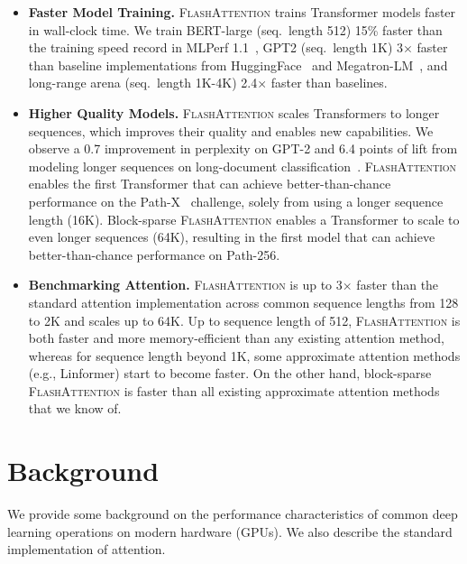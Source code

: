 \begin{itemize}[itemsep=0.1pt,topsep=0pt,leftmargin=*]
  \item \textbf{Faster Model Training.} \textsc{FlashAttention} trains Transformer models faster in wall-clock time. We train BERT-large (seq.\ length 512) 15\% faster than the training speed record in MLPerf 1.1~\citep{mattson2020mlperf}, GPT2 (seq.\ length 1K) 3$\times$ faster than baseline implementations from HuggingFace~\citep{wolf-etal-2020-transformers} and Megatron-LM~\citep{shoeybi2019megatron}, and long-range arena (seq.\ length 1K-4K) 2.4$\times$ faster than baselines.
  \item \textbf{Higher Quality Models.} \textsc{FlashAttention} scales Transformers to longer sequences, which improves their quality and enables new capabilities. We observe a 0.7 improvement in perplexity on GPT-2 and 6.4 points of lift from modeling longer sequences on long-document classification~\citep{dai2022revisiting}.
  \textsc{FlashAttention} enables the first Transformer that can achieve better-than-chance performance on the Path-X~\citep{tay2020long} challenge, solely from using a longer sequence length (16K). Block-sparse \textsc{FlashAttention} enables a Transformer to scale to even longer sequences (64K), resulting in the first model that can achieve better-than-chance performance on Path-256.
  \item \textbf{Benchmarking Attention.} \textsc{FlashAttention} is up to 3$\times$ faster than the standard attention implementation across common sequence lengths from 128 to 2K and scales up to 64K. Up to sequence length of 512, \textsc{FlashAttention} is both faster and more memory-efficient than any existing attention method, whereas for sequence length beyond 1K, some approximate attention methods (e.g., Linformer) start to become faster. On the other hand, block-sparse \textsc{FlashAttention} is faster than all existing approximate attention methods that we know of.

\end{itemize}

\section{Background}
\label{sec:background}

We provide some background on the performance characteristics of common deep learning operations on modern hardware (GPUs). We also describe the standard implementation of attention.

